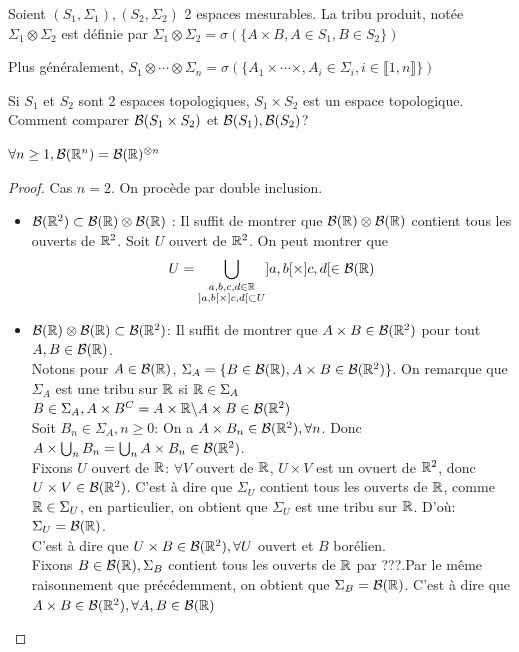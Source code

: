 \documentclass[]{report}
\begin{document}
    \begin{df}{}{}
        Soient $(S_1,\Sigma_1),(S_2,\Sigma_2)$ 2 espaces mesurables. La tribu produit, notée $\Sigma_1\otimes\Sigma_2$ est définie par $\Sigma_1\otimes\Sigma_2=\sigma(\{A\times B,A\in S_1,B\in S_2\})$
    \end{df}

    \begin{re}{}{}
        Plus généralement, $S_1\otimes \cdots\otimes\Sigma_n=\sigma(\{A_1\times\cdots\times,A_i\in\Sigma_i,i\in\llbracket 1,n\rrbracket\})$
    \end{re}

    \begin{qs*}
        Si $S_1$ et $S_2$ sont 2 espaces topologiques, $S_1\times S_2$ est un espace topologique. Comment comparer $\mathcal{B}(S_1\times S_2)$ et $\mathcal{B}(S_1),\mathcal{B}(S_2)$?
    \end{qs*}

    \begin{prop}{}{}
        $\forall n\ge 1, \mathcal{B}(\mathbb{R}^n)=\mathcal{B}(\mathbb{R})^{\otimes n}$
    \end{prop}

    \begin{proof}{}{}
        Cas $n=2$. On procède par double inclusion.
        \begin{itemize}
            \item $\mathcal{B}(\mathbb{R}^2)\subset\mathcal{B}(\mathbb{R})\otimes\mathcal{B}(\mathbb{R})$ : Il suffit de montrer que $\mathcal{B}(\mathbb{R})\otimes\mathcal{B}(\mathbb{R})$ contient tous les ouverts de $\mathbb{R}^2$. Soit $U$ ouvert de $\mathbb{R}^2$. On peut montrer que
                \[U=\bigcup_{\substack{a,b,c,d\in\mathbb{R}\\]a,b[\times]c,d[\subset U}} ]a,b[\times]c,d[\in\mathcal{B}(\mathbb{R})\]
            \item $\mathcal{B}(\mathbb{R})\otimes\mathcal{B}(\mathbb{R})\subset\mathcal{B}(\mathbb{R}^2)$: Il suffit de montrer que $A\times B\in\mathcal{B}(\mathbb{R}^2)$ pour tout $A,B\in\mathcal{B}(\mathbb{R})$.\\
                Notons pour $A\in\mathcal{B}(\mathbb{R})$, $\Sigma_A=\{B\in\mathcal{B}(\mathbb{R}),A\times B\in\mathcal{B}(\mathbb{R}^2)\}$. On remarque que $\Sigma_A$ est une tribu sur $\mathbb{R}$ si $\mathbb{R}\in\Sigma_A$\\
                $B\in\Sigma_A,A\times B^C=A\times\mathbb{R}\backslash A\times B\in\mathcal{B}(\mathbb{R}^2)$\\
                Soit $B_n\in \Sigma_A,n\ge 0$: On a $A\times B_n\in\mathcal{B}(\mathbb{R}^2),\forall n$. Donc $A\times \bigcup_n B_n=\bigcup_n A\times B_n\in\mathcal{B}(\mathbb{R}^2)$.\\
                Fixons $U$ ouvert de $\mathbb{R}$: $\forall V$ ouvert de $\mathbb{R}$, $U\times V$ est un ovuert de $\mathbb{R}^2$, donc $U\times V\in\mathcal{B}(\mathbb{R}^2)$. C'est à dire que $\Sigma_U$ contient tous les ouverts de $\mathbb{R}$, comme $\mathbb{R}\in\Sigma_U$, en particulier, on obtient que $\Sigma_U$ est une tribu sur $\mathbb{R}$. D'où: $\Sigma_U=\mathcal{B}(\mathbb{R})$.\\
                C'est à dire que $U\times B\in\mathcal{B}(\mathbb{R}^2),\forall U$ ouvert et $B$ borélien.\\
                Fixons $B\in\mathcal{B}(\mathbb{R}),\Sigma_B$ contient tous les ouverts de $\mathbb{R}$ par ???.Par le même raisonnement que précédemment, on obtient que $\Sigma_B=\mathcal{B}(\mathbb{R})$. C'est à dire que $A\times B\in\mathcal{B}(\mathbb{R}^2),\forall A,B\in\mathcal{B}(\mathbb{R})$ 
        \end{itemize}
    \end{proof}
\end{document}
